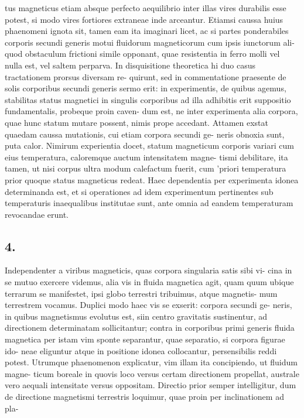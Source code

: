 \documentclass[12pt,a4paper]{article}
\begin{document}
tus magneticus etiam absque perfecto aequilibrio inter illas vires durabilis esse
potest, si modo vires fortiores extraneae inde arceantur.            Etiamsi caussa huius
phaenomeni ignota sit, tamen eam ita imaginari licet, ac si partes ponderabiles
corporis secundi generis motui fluidorum magneticorum cum ipsis iunctorum ali-
quod obstaculum frictioni simile opponant, quae resistentia in ferro molli vel
nulla est, vel saltem perparva.
In disquisitione theoretica hi duo casus tractationem prorsus diversam re-
quirunt, sed in commentatione praesente de solis corporibus secundi generis sermo
erit: in experimentis, de quibus agemus, stabilitas status magnetici in singulis
corporibus ad illa adhibitis erit suppositio fundamentalis, probeque proin caven-
dum est, ne inter experimenta alia corpora, quae hunc statum mutare possent,
nimis prope accedant.
Attamen exstat quaedam caussa mutationis, cui etiam corpora secundi ge-
neris obnoxia sunt, puta calor. Nimirum experientia docet, statum magneticum
corporis variari cum eius temperatura, caloremque auctum intensitatem magne-
tismi debilitare,   ita tamen,   ut nisi corpus   ultra modum      calefactum fuerit, cum
'priori temperatura prior quoque status magneticus redeat. Haec dependentia per
experimenta idonea determinanda est, et si operationes ad idem experimentum
pertinentes sub temperaturis inaequalibus institutae sunt, ante omnia ad eandem
temperaturam revocandae erunt.


\subsection*{4.}

Independenter a viribus magneticis, quas corpora singularia satis sibi vi-
cina in se mutuo exercere videmus, alia vis in fluida magnetica agit, quam quum
ubique terrarum se manifestet, ipsi globo terrestri tribuimus, atque magnetis-
mum terrestrem vocamus.     Duplici modo haec vis se exserit: corpora secundi ge-
neris, in quibus magnetismus evolutus est, siin centro gravitatis sustinentur, ad
directionem determinatam sollicitantur; contra in corporibus primi generis fluida
magnetica per istam vim sponte separantur, quae separatio, si corpora figurae ido-
neae eliguntur atque in positione idonea collocantur, persensibilis reddi potest.
Utrumque phaenomenon explicatur, vim illam ita concipiendo, ut fluidum magne-
ticum boreale in quovis loco versus certam directionem propellat, australe vero
aequali intensitate versus oppositam. Directio prior semper intelligitur, dum de
directione magnetismi terrestris loquimur, quae proin per inclinationem ad pla-
\end{document}
